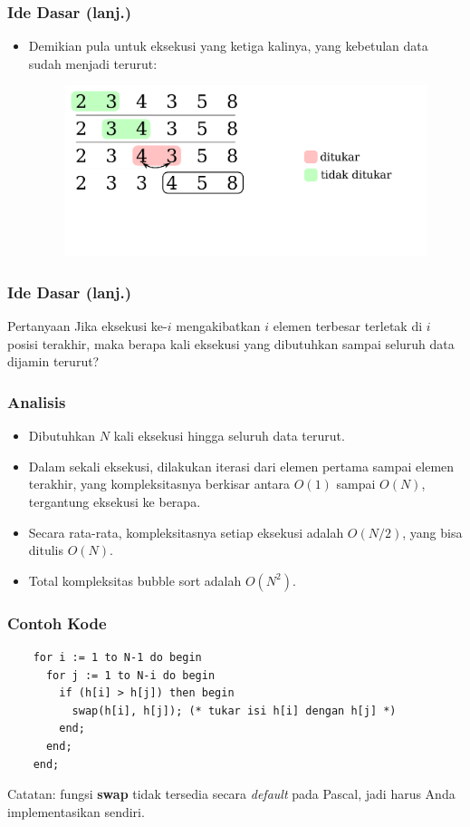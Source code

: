 \begin{frame}
\frametitle{Ide Dasar (lanj.)}
  \begin{itemize}
    \item Demikian pula untuk eksekusi yang ketiga kalinya, yang
    kebetulan data sudah menjadi terurut:
    \begin{figure}
      \includegraphics[width=11cm]{asset/bubble-sort-3.pdf}
    \end{figure}
  \end{itemize}
\end{frame}

\begin{frame}
\frametitle{Ide Dasar (lanj.)}
  \begin{block}{Pertanyaan}
    Jika eksekusi ke-$i$ mengakibatkan $i$ elemen terbesar terletak di $i$
    posisi terakhir, maka berapa kali eksekusi yang dibutuhkan sampai
    seluruh data dijamin terurut?
  \end{block}
\end{frame}

\begin{frame}
\frametitle{Analisis}
  \begin{itemize}
    \item Dibutuhkan $N$ kali eksekusi hingga seluruh data terurut.
    \item Dalam sekali eksekusi, dilakukan iterasi dari elemen pertama
    sampai elemen terakhir, yang kompleksitasnya berkisar antara
    $O(1)$ sampai $O(N)$, tergantung eksekusi ke berapa.
    \item Secara rata-rata, kompleksitasnya setiap eksekusi adalah
    $O(N/2)$, yang bisa ditulis $O(N)$.
    \item Total kompleksitas bubble sort adalah $O(N^2)$.
  \end{itemize}
\end{frame}

\begin{frame}[fragile]
\frametitle{Contoh Kode}
  \begin{lstlisting}
    for i := 1 to N-1 do begin
      for j := 1 to N-i do begin
        if (h[i] > h[j]) then begin
          swap(h[i], h[j]); (* tukar isi h[i] dengan h[j] *)
        end;
      end;
    end;
  \end{lstlisting}
  Catatan: fungsi \textbf{swap} tidak tersedia secara \textit{default} pada Pascal, jadi harus Anda implementasikan sendiri.
\end{frame}

